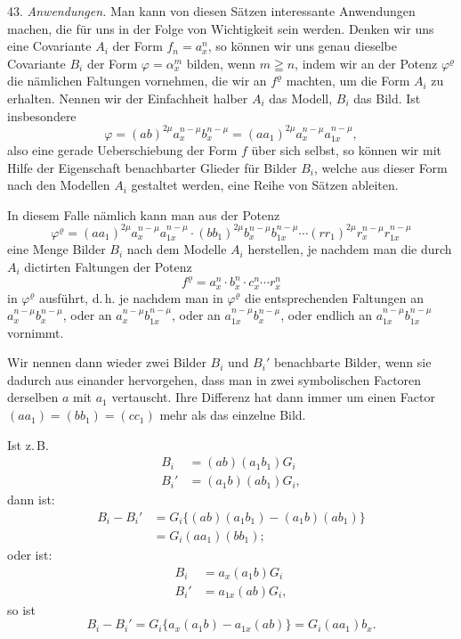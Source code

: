 43. \textit{Anwendungen.} Man kann von diesen Sätzen interessante Anwendungen
machen, die für uns in der Folge von Wichtigkeit sein werden. Denken wir uns
eine Covariante $A_i$ der Form $f_n=a_x^n$, so können wir uns genau dieselbe
Covariante $B_i$ der Form $\varphi=\alpha_x^m$ bilden, wenn $m\geqq n$, indem
wir an der Potenz $\varphi^\varrho$ die nämlichen Faltungen vornehmen, die wir
an $f^\varrho$ machten, um die Form $A_i$ zu erhalten. Nennen wir der
Einfachheit halber $A_i$ das Modell, $B_i$ das Bild. Ist insbesondere
\[
\varphi=(ab)^{2\mu}a_x^{n-\mu}b_x^{n-\mu}=(aa_1)^{2\mu}a_x^{n-\mu}a_{1x}^{n-\mu}, %
\]
also eine gerade Ueberschiebung der Form $f$ über sich selbst, so können wir
mit Hilfe der Eigenschaft benachbarter Glieder für Bilder $B_i$, welche aus
dieser Form nach den Modellen $A_i$ gestaltet werden, eine Reihe von Sätzen
ableiten.

In diesem Falle nämlich kann man aus der Potenz
\[
\varphi^\varrho=(aa_1)^{2\mu}a_x^{n-\mu}a_{1x}^{n-\mu}\cdot(bb_1)^{2\mu}b_x^{n-\mu}b_{1x}^{n-\mu}\cdots(rr_1)^{2\mu}r_x^{n-\mu}r_{1x}^{n-\mu} %
\]
eine Menge Bilder $B_i$ nach dem Modelle $A_i$ herstellen, je nachdem man die
durch $A_i$ dictirten Faltungen der Potenz
\[
f^\varrho=a_x^n\cdot b_x^n\cdot c_x^n\cdots r_x^n
\]
in $\varphi^\varrho$ ausführt, d.\,h. je nachdem man in $\varphi^\varrho$ die
entsprechenden Faltungen an $a_x^{n-\mu}b_x^{n-\mu}$, oder an
$a_x^{n-\mu}b_{1x}^{n-\mu}$, oder an $a_{1x}^{n-\mu}b_x^{n-\mu}$, oder
endlich an $a_{1x}^{n-\mu}b_{1x}^{n-\mu}$ vornimmt.

Wir nennen dann wieder zwei Bilder $B_i$ und $B_i'$ benachbarte Bilder, wenn
sie dadurch aus einander hervorgehen, dass man in zwei symbolischen Factoren
derselben $a$ mit $a_1$ vertauscht. Ihre Differenz hat dann immer um einen
Factor $(aa_1)=(bb_1)=(cc_1)$ mehr als das einzelne Bild.

Ist z.\,B.
\[
\begin{aligned}
B_i&=(ab)(a_1b_1)G_i\\
B_i'&=(a_1b)(ab_1)G_i,
\end{aligned}
\]
dann ist:
\[
\begin{aligned}
B_i-B_i'&=G_i\{(ab)(a_1b_1)-(a_1b)(ab_1)\}\\
&=G_i(aa_1)(bb_1);
\end{aligned}
\]
oder ist:
\[
\begin{aligned}
B_i&=a_x(a_1b)G_i\\
B_i'&=a_{1x}(ab)G_i,
\end{aligned}
\]
so ist
\[
B_i-B_i'=G_i\{a_x(a_1b)-a_{1x}(ab)\}=G_i(aa_1)b_x.
\]


